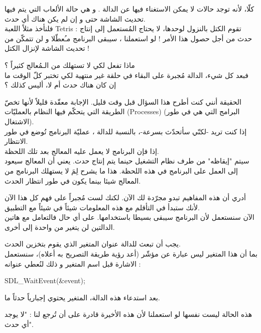 كلّا، لأنه توجد حالات لا يمكن الاستغناء فيها عن الدالة 
.
و هي حالة الألعاب التي يتم فيها تحديث الشاشة حتى و إن لم يكن هناك أي حدث.\\
فلنأخذ مثلاً اللعبة 
\textenglish{Tetris} :
تقوم الكتل بالنزول لوحدها، لا يحتاج المُستعمل إلى إنتاج حدث من أجل حصول هذا الأمر ! لو استعملنا
،
سيبقى البرنامج مـُعطّلا و لن تتمكّن من تحديث الشاشة لإنزال الكتل !

\begin{question}
ماذا تفعل
لكي لا تستهلك من الـمُعالج كثيراً ؟\\
فبعد كل شيء، الدالة مُجبرة على البقاء في حلقة غير منتهية لكي تختبر كلّ الوقت ما إن كان هناك حدث أم لا، أليس كذلك ؟
\end{question}

الحقيقة أنني كنت أطرح هذا السؤال قبل وقت قليل. الإجابة معقّدة قليلاً لأنها تخصّ الطريقة التي يتحكّم فيها النظام بالعمليّات 
(\textenglish{Processes})
(البرامج التي هي في طور الاشتغال).\\
إذا كنت تريد -لكنّي سأتحدّث بسرعة-، بالنسبة للدالة 
،
عمليّة البرنامج تُوضع في طور الانتظار.\\
إذا فإن البرنامج لا يعمل عليه المعالج بعد تلك اللحظة.\\
سيتم "إيقاظه" من طرف نظام التشغيل حينما يتم إنتاج حدث. يعني أن المعالج سيعود إلى العمل على البرنامج في هذه اللحظة. هذا ما يشرح لِمَ لا يستهلك البرنامج من المعالج شيئا بينما يكون في طور انتظار الحدث.

أدري أن هذه المفاهيم تبدو مجرّدة لك الآن. لكنك لست مُجبراً على فهم كل هذا الآن لأنك ستبدأ في التأقلم مع هذه المعلومات شيئاً في شيئاً مع التطبيق.\\
الآن سنستعمل 
لأن البرنامج سيبقى بسيطا باستخدامها. على أي حال فالتعامل مع هاتين الدالتين لن يتغير من واحدة إلى أخرى.

يجب أن تبعث للدالة عنوان المتغير 
الذي يقوم بتخزين الحدث.\\
بما أن هذا المتغير ليس عبارة عن مؤشّر (أعد رؤية طريقة التصريح به أعلاه)، سنستعمل الاشارة
\InlineCode{\&}
قبل اسم المتغير و ذلك لنُعطي عنوانه :

\begin{Csource}
SDL_WaitEvent(&event);
\end{Csource}

بعد استدعاء هذه الدالة، المتغير
يحتوي إجبارياً حدثاً ما.

\begin{information}
هذه الحالة ليست نفسها لو استعملنا
لأن هذه الأخيرة قادرة على أن تُرجع لنا : "لا يوجد أي حدث".
\end{information}

